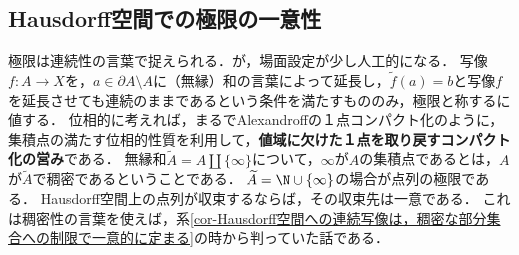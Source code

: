 \documentclass[uplatex,dvipdfmx]{jsreport}
\begin{document}
\subsection{Hausdorff空間での極限の一意性}

\begin{tcolorbox}[colframe=ForestGreen, colback=ForestGreen!10!white, breakable ,colbacktitle=ForestGreen!40!white, coltitle=black,fonttitle=\bfseries\sffamily
    ,title=極限]
    極限は連続性の言葉で捉えられる．が，場面設定が少し人工的になる．
    写像$f:A\to X$を，$a\in \partial A\setminus A$に（無縁）和の言葉によって延長し，$\widetilde{f}(a)=b$と写像$f$を延長させても連続のままであるという条件を満たすもののみ，極限と称するに値する．
    位相的に考えれば，まるでAlexandroffの１点コンパクト化のように，集積点の満たす位相的性質を利用して，\textbf{値域に欠けた１点を取り戻すコンパクト化の営み}である．
    無縁和$\widetilde{A}=A\coprod\{\infty\}$について，$\infty$が$A$の集積点であるとは，$A$が$\widetilde{A}$で稠密であるということである．
    $\widetilde{A}=\N\cup\{\infty\}$の場合が点列の極限である．
    Hausdorff空間上の点列が収束するならば，その収束先は一意である．
    これは稠密性の言葉を使えば，系\ref{cor-Hausdorff空間への連続写像は，稠密な部分集合への制限で一意的に定まる}の時から判っていた話である．
\end{tcolorbox}
\end{document}
